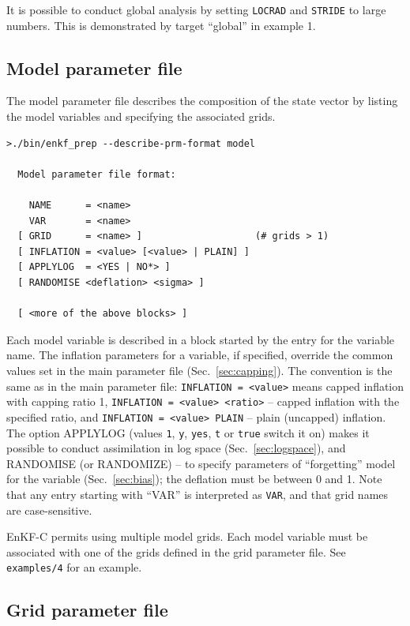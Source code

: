 \documentclass[11pt]{report}
\begin{document}
It is possible to conduct global analysis by setting \verb|LOCRAD| and \verb|STRIDE| to large numbers.
This is demonstrated by target ``global'' in example 1.

\subsection{Model parameter file}
\label{sec:modelprm}

The model parameter file describes the composition of the state vector by listing the model variables and specifying the associated grids.

\begin{Verbatim}[frame=single,fontsize=\footnotesize]
>./bin/enkf_prep --describe-prm-format model

  Model parameter file format:

    NAME      = <name>
    VAR       = <name>
  [ GRID      = <name> ]                    (# grids > 1)
  [ INFLATION = <value> [<value> | PLAIN] ]
  [ APPLYLOG  = <YES | NO*> ]
  [ RANDOMISE <deflation> <sigma> ]

  [ <more of the above blocks> ]
\end{Verbatim}

Each model variable is described in a block started by the entry for the variable name.
The inflation parameters for a variable, if specified, override the common values set in the main parameter file (Sec.~\ref{sec:capping}).
The convention is the same as in the main parameter file: \verb|INFLATION = <value>| means capped inflation with capping ratio 1, \verb|INFLATION = <value> <ratio>| -- capped inflation with the specified ratio, and \verb|INFLATION = <value> PLAIN| -- plain (uncapped) inflation.
The option APPLYLOG (values \verb|1|, \verb|y|, \verb|yes|, \verb|t| or \verb|true| switch it on) makes it possible to conduct assimilation in log space (Sec.~\ref{sec:logspace}), and RANDOMISE (or RANDOMIZE) -- to specify parameters of ``forgetting'' model for the variable (Sec.~\ref{sec:bias}); the deflation must be between 0 and 1.
Note that any entry starting with ``VAR'' is interpreted as \verb|VAR|, and that grid names are case-sensitive.

EnKF-C permits using multiple model grids.
Each model variable must be associated with one of the grids defined in the grid parameter file.
See \verb|examples/4| for an example.

\subsection{Grid parameter file}
\label{sec:gridprm}
\end{document}
